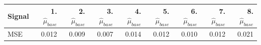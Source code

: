 \begin{tabular}{lrrrrrrrr}
\toprule
Signal & 1. $\hat\mu_{base}$ & 2. $\hat\mu_{base}$ & 3. $\hat\mu_{base}$ & 4. $\hat\mu_{base}$ & 5. $\hat\mu_{base}$ & 6. $\hat\mu_{base}$ & 7. $\hat\mu_{base}$ & 8. $\hat\mu_{base}$ \\
\midrule
MSE & 0.012 & 0.009 & 0.007 & 0.014 & 0.012 & 0.010 & 0.012 & 0.021 \\
\bottomrule
\end{tabular}
